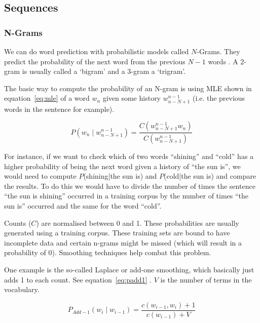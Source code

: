 \subsection{Sequences}


\subsubsection{N-Grams}
\label{s:ngrams}

We can do word prediction with probabilistic models called $N$-Grams. They predict the probability of the next word from the previous $N-1$ words \autocite{Jurafsky2009}. A 2-gram is usually called a `bigram' and a 3-gram a `trigram'.

The basic way to compute the probability of an N-gram is using \ac{MLE} shown in equation~\ref{eq:mle}\marginnote{$\bm{\Sigma}$~\ref{eq:mle}} \autocite{Jurafsky2009} of a word $w_n$ given some history $w_{n-N+1}^{n-1}$ (i.e. the previous words in the sentence for example).

\begin{equation}
  P(w_n \mid w_{n-N+1}^{n-1}) = \frac{C(w_{n-N+1}^{n-1} w_n)}{C(w_{n-N+1}^{n-1})}
  \label{eq:mle}
\end{equation}

For instance, if we want to check which of two words ``shining'' and ``cold'' has a higher probability of being the next word given a history of ``the sun is'', we would need to compute $P$(shining|the sun is) and $P$(cold|the sun is) and compare the results. To do this we would have to divide the number of times the sentence ``the sun is shining'' occurred in a training corpus by the number of times ``the sun is'' occurred and the same for the word ``cold''.

Counts ($C$) are normalised between 0 and 1. These probabilities are usually generated using a training corpus. These training sets are bound to have incomplete data and certain n-grams might be missed (which will result in a probability of 0). Smoothing techniques help combat this problem. 

One example is the so-called Laplace or add-one smoothing, which basically just adds 1 to each count. See equation~\ref{eq:padd1}\marginnote{$\bm{\Sigma}$~\ref{eq:padd1}} \autocite{Jurafsky2009}. $V$ is the number of terms in the vocabulary.

\begin{equation}
  P_{Add-1}(w_i \mid w_{i-1}) = \frac{c(w_{i-1}, w_i) + 1}{c(w_{i-1}) + V}
  \label{eq:padd1}
\end{equation}

